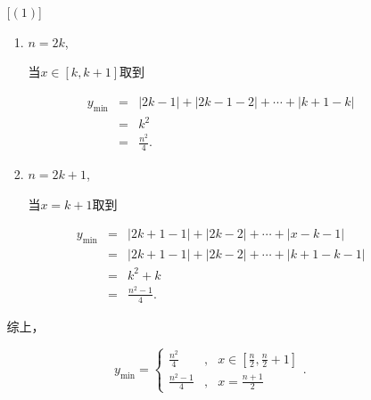 \documentclass[8pt]{article}
\begin{document}
\begin{enumerate}
\begin{enumerate} [$(1)$]
					\begin{enumerate} [$1^{\circ}$]
						\item
							$n=2k$,

							当$x\in[k,k+1]$取到

							$$
							\begin{array}{rcl}
								y_{\min}&=&|2k-1|+|2k-1-2|+\cdots+|k+1-k|\\
								&=&k^2\\
								&=&\frac{n^2}{4}.
							\end{array}
							$$

						\item
							$n=2k+1$,

							当$x=k+1$取到

							$$
							\begin{array}{rcl}
								y_{\min}&=&|2k+1-1|+|2k-2|+\cdots+|x-k-1|\\
								&=&|2k+1-1|+|2k-2|+\cdots+|k+1-k-1|\\
								&=&k^2+k\\
								&=&\frac{n^2-1}{4}.
							\end{array}
							$$
					\end{enumerate}

					综上，

					$$
					y_{\min}=\left\{
					\begin{array}{rcl}
					\frac{n^2}{4}&,&x\in\left[\frac{n}{2},\frac{n}{2}+1\right]\\
					\frac{n^2-1}{4}&,&x=\frac{n+1}{2}
					\end{array}
					\right..
					$$

			\end{enumerate}
			
	\end{enumerate}
\end{document}

